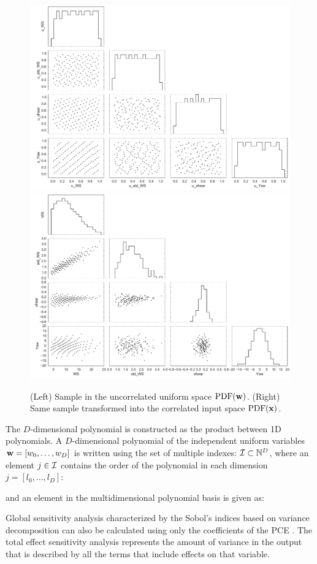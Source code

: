 \documentclass[preprint,12pt]{elsarticle}
\begin{document}
\begin{figure}[h!]
\begin{centering}
\includegraphics[width=0.48\columnwidth]{Figures/PCE_train_x_Unif.pdf}
\includegraphics[width=0.48\columnwidth]{Figures/PCE_train_x.pdf}
\caption{(Left) Sample in the uncorrelated uniform space $\mathrm{PDF}(\mathbf{w})$. (Right) Same sample transformed into the correlated input space $\mathrm{PDF}(\mathbf{x})$.}
\label{fig_rosen}
\end{centering}
\end{figure}

The $D$-dimensional polynomial is constructed as the product between 1D polynomials. A $D$-dimensional polynomial of the independent uniform variables $\mathbf{w}=[w_0,\dots,w_D]$ is written using the set of multiple indexes: $\mathcal{I} \subset \mathbb{N}^D$, where an element $j\in \mathcal{I}$ contains the order of the polynomial in each dimension $j = [l_0, \dots, l_D]$:


and an element in the multidimensional polynomial basis is given as:


Global sensitivity analysis characterized by the Sobol's indices based on variance decomposition can also be calculated using only the coefficients of the PCE \cite{sudret2008global}. The total effect sensitivity analysis represents the amount of variance in the output that is described by all the terms that include effects on that variable.
\end{document}
